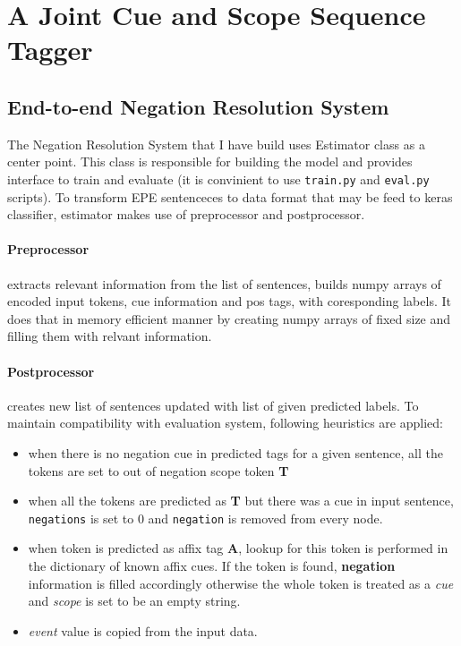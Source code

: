 \documentclass{article}
\begin{document}
\newpage
\section{A Joint Cue and Scope Sequence Tagger}
\subsection{End-to-end Negation Resolution System}
The Negation Resolution System that I have build uses Estimator class as a center point.
This class is responsible for building the model and provides interface to train and evaluate 
(it is convinient to use \lstinline{train.py} and \lstinline{eval.py} scripts). To transform
EPE sentenceces to data format that may be feed to keras classifier, estimator makes use of
preprocessor and postprocessor.
\paragraph{Preprocessor} extracts relevant information from the list of sentences,
builds numpy arrays of encoded input tokens, cue information and pos tags, with coresponding labels.
It does that in memory efficient manner by creating numpy arrays of fixed size and filling them with
relvant information.
\paragraph{Postprocessor} creates new list of sentences updated with list of given predicted labels.
To maintain compatibility with evaluation system, following heuristics are applied:
\begin{itemize}
\item when there is no negation cue in predicted tags for a given sentence, all the tokens are set to
out of negation scope token \textbf{T}
\item when all the tokens are predicted as \textbf{T} but there was a cue in input sentence,
\lstinline{negations} is set to 0 and \lstinline{negation} is removed from every node.
\item when token is predicted as affix tag \textbf{A}, lookup for this token is performed in the dictionary
of known affix cues. If the token is found, \textbf{negation} information is filled accordingly otherwise
the whole token is treated as a \textit{cue} and \textit{scope} is set to be an empty string.
\item \textit{event} value is copied from the input data.
\end{itemize}
\end{document}
